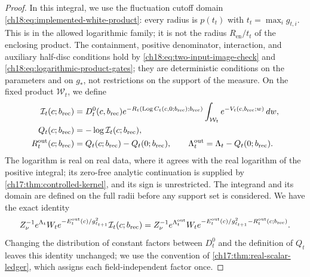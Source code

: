 \begin{proof}
In this integral, we use the fluctuation cutoff domain \eqref{ch18:eq:implemented-white-product}: every radius is $p(t_t)$ with $t_t=\max_ig_{t,i}$. This is in the allowed logarithmic family; it is not the radius $R_{\mathrm{en}}/t_t$ of the enclosing product. The containment, positive denominator, interaction, and auxiliary half-disc conditions hold by \eqref{ch18:eq:two-input-image-check} and \eqref{ch18:eq:logarithmic-product-gates}; they are deterministic conditions on the parameters and on $g_*$, not restrictions on the support of the measure. On the fixed product $\mathcal W_t$, we define
\begin{equation}\label{ch18:eq:analytic-output-definition}
 \begin{split}
 \mathcal I_t(c;b_{\mathrm{rec}})
  &=D_t^{0}(c,b_{\mathrm{rec}})
       e^{-R_t(\operatorname{Log} C_t(c,0;b_{\mathrm{rec}});b_{\mathrm{rec}})}
             \int_{\mathcal W_t}e^{-V_t(c,b_{\mathrm{rec}};w)}\,dw,\\
 Q_t(c;b_{\mathrm{rec}})&=-\log\mathcal I_t(c;b_{\mathrm{rec}}),\\
 R_t^{\mathrm{out}}(c;b_{\mathrm{rec}})&=Q_t(c;b_{\mathrm{rec}})-Q_t(0;b_{\mathrm{rec}}),\qquad
 \Lambda_t^{\mathrm{out}}=\Lambda_t-Q_t(0;b_{\mathrm{rec}}).
 \end{split}
\end{equation}
The logarithm is real on real data, where it agrees with the real logarithm of the positive integral; its zero-free analytic continuation is supplied by \cref{ch17:thm:controlled-kernel}, and its sign is unrestricted. The integrand and its domain are defined on the full radii before any support set is considered. We have the exact identity
\begin{equation}\label{ch18:eq:auxiliary-output}
 Z_\nu^{-1}e^{\Lambda_t}W_t
       e^{-E_t^{\mathrm{out}}(c)/g_{\ell_{t+1}}^2}
                \mathcal I_t(c;b_{\mathrm{rec}})
 =Z_\nu^{-1}e^{\Lambda_t^{\mathrm{out}}}W_t
       e^{-E_t^{\mathrm{out}}(c)/g_{\ell_{t+1}}^2
                         -R_t^{\mathrm{out}}(c;b_{\mathrm{rec}})}.
\end{equation}
Changing the distribution of constant factors between $D_t^0$ and the definition of $Q_t$ leaves this identity unchanged; we use the convention of \cref{ch17:thm:real-scalar-ledger}, which assigns each field-independent factor once.


\end{proof}
